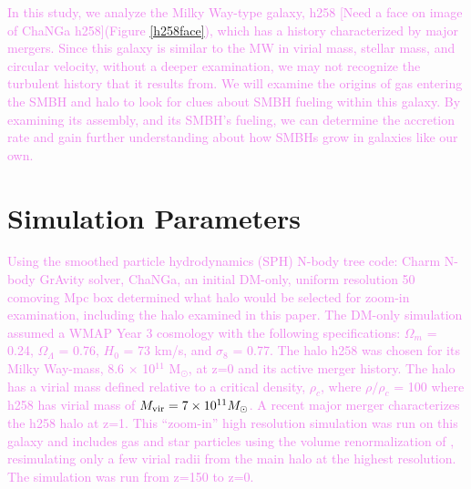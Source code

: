 \documentclass[manuscript]{aastex}
\begin{document}
\textcolor{violet}{
In this study, we analyze the Milky Way-type galaxy, h258 [Need a face on image of ChaNGa h258](Figure \ref{h258face}), which has a history characterized by major mergers. Since this galaxy is similar to the MW in virial mass, stellar mass, and circular velocity, without a deeper examination, we may not recognize the turbulent history that it results from. We will examine the origins of gas entering the SMBH and halo to look for clues about SMBH fueling within this galaxy. By examining its assembly, and its SMBH's fueling, we can determine the accretion rate and gain further understanding about how SMBHs grow in galaxies like our own.
}




\section{Simulation Parameters}\label{sec-model}

\textcolor{violet}{
Using the smoothed particle hydrodynamics (SPH) N-body tree code: Charm N-body GrAvity solver, ChaNGa, an initial DM-only, uniform resolution 50 comoving Mpc box determined what halo would be selected for zoom-in examination, including the halo examined in this paper. The DM-only simulation assumed a WMAP Year 3 cosmology \citep{Spergel2007} with the following specifications: $\Omega _m$ = 0.24, $\Omega _{\Lambda}$ = 0.76, $H_0$ = 73 km/s, and $\sigma _8$ = 0.77. The halo h258 was chosen for its Milky Way-mass, 8.6 $\times$ 10$^{11}$  M$_{\odot}$, at z=0 and its active merger history. The halo has a virial mass defined relative to a critical density, $\rho _c$, where $\rho / \rho _c$ = 100 where h258 has virial mass of $M_{\rm vir} = 7 \times 10^{11} M_{\odot}$. A recent major merger characterizes the h258 halo at z=1. This ``zoom-in'' high resolution simulation was run on this galaxy and includes gas and star particles using the volume renormalization of \cite{Katz1993}, resimulating only a few virial radii from the main halo at the highest resolution. The simulation was run from z=150 to z=0.  
}
\end{document}
